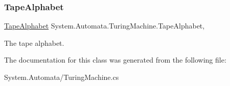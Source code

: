\subsubsection{\texorpdfstring{Tape\+Alphabet}{TapeAlphabet}}
{\footnotesize\ttfamily \mbox{\hyperlink{class_system_1_1_automata_1_1_tape_alphabet}{Tape\+Alphabet}} System.\+Automata.\+Turing\+Machine.\+Tape\+Alphabet\hspace{0.3cm}{\ttfamily [get]}, {}}



The tape alphabet. 



The documentation for this class was generated from the following file\+:\begin{DoxyCompactItemize}
\item 
System.\+Automata/Turing\+Machine.\+cs\end{DoxyCompactItemize}
